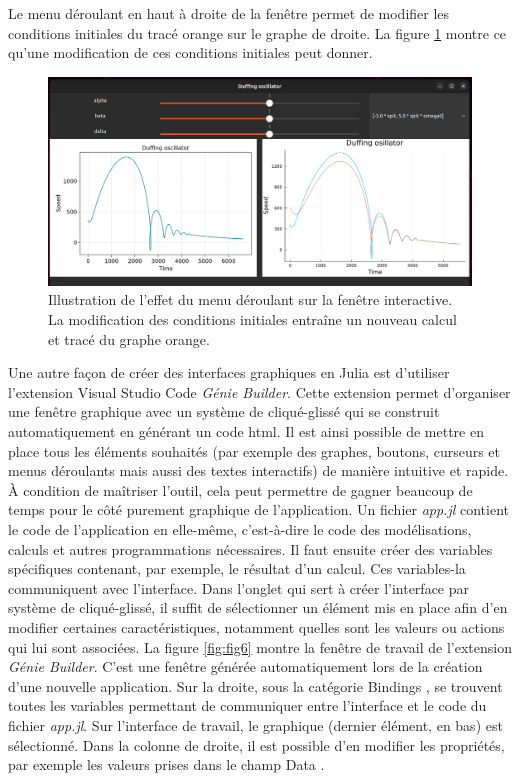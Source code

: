 \documentclass[a4paper, french, 12pt, titlepage]{article}
\begin{document}
Le menu déroulant en haut à droite de la fenêtre permet de modifier les conditions initiales du tracé orange sur le graphe de droite.
La figure \ref{fig:fig5} montre ce qu'une modification de ces conditions initiales peut donner. 

\begin{figure}[H]
  \includegraphics[width=\linewidth]{interactivewindow_4.png}
  \caption{Illustration de l'effet du menu déroulant sur la fenêtre interactive. La modification des conditions initiales entraîne un nouveau calcul et tracé du graphe orange.}
  \label{fig:fig5}
\end{figure}

Une autre façon de créer des interfaces graphiques en Julia est d'utiliser l'extension Visual Studio Code \emph{Génie Builder}.
Cette extension permet d'organiser une fenêtre graphique avec un système de \og{} cliqué-glissé\fg{} qui se construit automatiquement en générant un code html.
Il est ainsi possible de mettre en place tous les éléments souhaités (par exemple des graphes, boutons, curseurs et menus déroulants mais aussi des textes interactifs) de manière intuitive et rapide.
À condition de maîtriser l'outil, cela peut permettre de gagner beaucoup de temps pour le côté purement graphique de l'application.
Un fichier \emph{app.jl} contient le code de l'application en elle-même, c'est-à-dire le code des modélisations, calculs et autres programmations nécessaires.
Il faut ensuite créer des variables spécifiques contenant, par exemple, le résultat d'un calcul.
Ces variables-la communiquent avec l'interface.
Dans l'onglet qui sert à créer l'interface par système de cliqué-glissé, il suffit de sélectionner un élément mis en place afin d'en modifier certaines caractéristiques, notamment quelles sont les valeurs ou actions qui lui sont associées. 
La figure \ref{fig:fig6} montre la fenêtre de travail de l'extension \emph{Génie Builder}.
C'est une fenêtre générée automatiquement lors de la création d'une nouvelle application.
Sur la droite, sous la catégorie \og Bindings \fg, se trouvent toutes les variables permettant de communiquer entre l'interface et le code du fichier \emph{app.jl}.
Sur l'interface de travail, le graphique (dernier élément, en bas) est sélectionné.
Dans la colonne de droite, il est possible d'en modifier les propriétés, par exemple les valeurs prises dans le champ \og Data \fg. 
\end{document}
